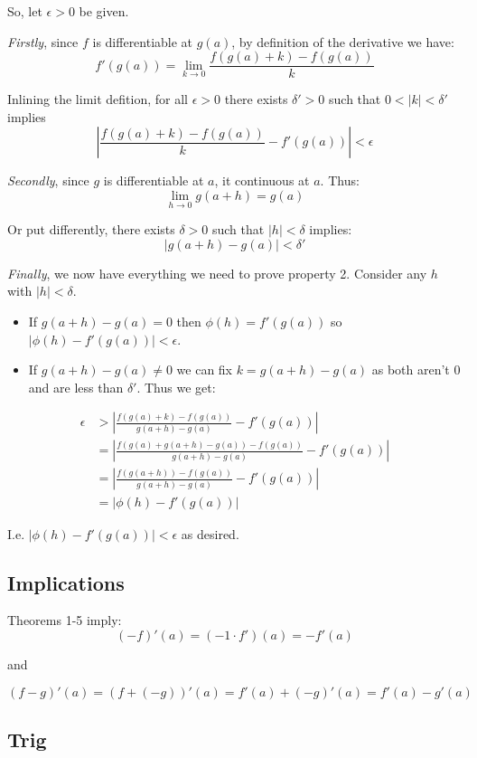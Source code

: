 So, let $\epsilon>0$ be given.

\vs

\textit{Firstly}, since $f$ is differentiable at $g(a)$, by definition
of the derivative we have:
\[f'(g(a))=\lim_{k\to0}\frac{f(g(a)+k)-f(g(a))}{k}\]

Inlining the limit defition, for all $\epsilon>0$ there exists
$\delta'>0$ such that $0<|k|<\delta'$ implies
\[\left|\frac{f(g(a)+k)-f(g(a))}{k}-f'(g(a))\right|<\epsilon\]

\textit{Secondly}, since $g$ is differentiable at $a$, it continuous
at $a$. Thus:
\[\lim_{h\to0}g(a+h)=g(a)\]

Or put differently, there exists $\delta>0$ such that $|h|<\delta$ implies:
\[|g(a+h)-g(a)|<\delta'\]

\textit{Finally}, we now have everything we need to prove property 2.
Consider any $h$ with $|h|<\delta$.
\begin{itemize}
\item If $g(a+h)-g(a)=0$ then $\phi(h)=f'(g(a))$ so $|\phi(h)-f'(g(a))|<\epsilon$.
\item If $g(a+h)-g(a)\neq0$ we can fix $k=g(a+h)-g(a)$ as both aren't
  $0$ and are less than $\delta'$. Thus we get:
\end{itemize}

\begin{align*}
  \epsilon&>\left|\frac{f(g(a)+k)-f(g(a))}{g(a+h)-g(a)}-f'(g(a))\right|\\
  &=\left|\frac{f(g(a)+g(a+h)-g(a))-f(g(a))}{g(a+h)-g(a)}-f'(g(a))\right|\\
  &=\left|\frac{f(g(a+h))-f(g(a))}{g(a+h)-g(a)}-f'(g(a))\right|\\
  &=\left|\phi(h)-f'(g(a))\right|
\end{align*}

I.e. $\left|\phi(h)-f'(g(a))\right|<\epsilon$ as desired.


\subsection{Implications}
Theorems 1-5 imply:
\[(-f)'(a)=(-1\cdot f')(a)=-f'(a)\]
\begin{center}and\end{center}
\[(f-g)'(a)=(f+(-g))'(a)=f'(a)+(-g)'(a)=f'(a)-g'(a)\]

\subsection{Trig}

